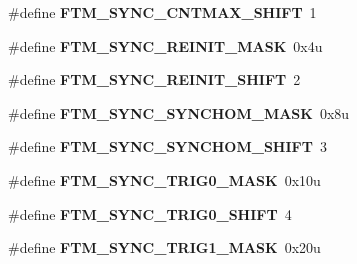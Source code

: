 \begin{DoxyCompactItemize}
\item 
\#define {\bfseries F\+T\+M\+\_\+\+S\+Y\+N\+C\+\_\+\+C\+N\+T\+M\+A\+X\+\_\+\+S\+H\+I\+FT}~1\hypertarget{group__FTM__Register__Masks_gad9a59cf6ab219dcb7f646d74e599ddb4}{}\label{group__FTM__Register__Masks_gad9a59cf6ab219dcb7f646d74e599ddb4}

\item 
\#define {\bfseries F\+T\+M\+\_\+\+S\+Y\+N\+C\+\_\+\+R\+E\+I\+N\+I\+T\+\_\+\+M\+A\+SK}~0x4u\hypertarget{group__FTM__Register__Masks_gafae9d365874a8b4adc13ccc1a3873b6a}{}\label{group__FTM__Register__Masks_gafae9d365874a8b4adc13ccc1a3873b6a}

\item 
\#define {\bfseries F\+T\+M\+\_\+\+S\+Y\+N\+C\+\_\+\+R\+E\+I\+N\+I\+T\+\_\+\+S\+H\+I\+FT}~2\hypertarget{group__FTM__Register__Masks_gaf3a51fedf11a10a6793f9df11ca77e87}{}\label{group__FTM__Register__Masks_gaf3a51fedf11a10a6793f9df11ca77e87}

\item 
\#define {\bfseries F\+T\+M\+\_\+\+S\+Y\+N\+C\+\_\+\+S\+Y\+N\+C\+H\+O\+M\+\_\+\+M\+A\+SK}~0x8u\hypertarget{group__FTM__Register__Masks_ga1393ccaf9753328f3b3b65cf28f6804f}{}\label{group__FTM__Register__Masks_ga1393ccaf9753328f3b3b65cf28f6804f}

\item 
\#define {\bfseries F\+T\+M\+\_\+\+S\+Y\+N\+C\+\_\+\+S\+Y\+N\+C\+H\+O\+M\+\_\+\+S\+H\+I\+FT}~3\hypertarget{group__FTM__Register__Masks_ga9f4fbe85603aa455463585444e27dbb3}{}\label{group__FTM__Register__Masks_ga9f4fbe85603aa455463585444e27dbb3}

\item 
\#define {\bfseries F\+T\+M\+\_\+\+S\+Y\+N\+C\+\_\+\+T\+R\+I\+G0\+\_\+\+M\+A\+SK}~0x10u\hypertarget{group__FTM__Register__Masks_ga5ee32a648ec1a88f07ea32b9a680684b}{}\label{group__FTM__Register__Masks_ga5ee32a648ec1a88f07ea32b9a680684b}

\item 
\#define {\bfseries F\+T\+M\+\_\+\+S\+Y\+N\+C\+\_\+\+T\+R\+I\+G0\+\_\+\+S\+H\+I\+FT}~4\hypertarget{group__FTM__Register__Masks_ga1b676aad473928dd52e5d757149ab445}{}\label{group__FTM__Register__Masks_ga1b676aad473928dd52e5d757149ab445}

\item 
\#define {\bfseries F\+T\+M\+\_\+\+S\+Y\+N\+C\+\_\+\+T\+R\+I\+G1\+\_\+\+M\+A\+SK}~0x20u\hypertarget{group__FTM__Register__Masks_gab2caa82ba7f028e7a696a8e02b7f87ac}{}\label{group__FTM__Register__Masks_gab2caa82ba7f028e7a696a8e02b7f87ac}


\end{DoxyCompactItemize}

